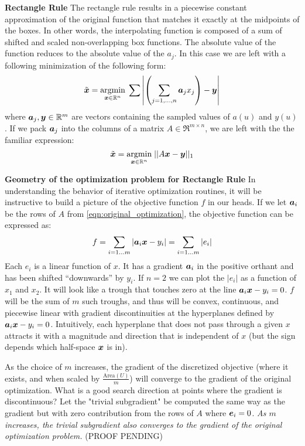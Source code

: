 \documentclass[12pt,journal,draftcls,letterpaper,onecolumn]{IEEEtran}
\begin{document}
{\bf Rectangle Rule} The rectangle rule results in a piecewise constant approximation of the original function that matches it exactly at the midpoints of the boxes. In other words, the interpolating function is composed of a sum of shifted and scaled non-overlapping box functions.  The absolute value of the function reduces to the absolute value of the $a_j$.  In this case we are left with a following minimization of the following form:
\begin{equation}\label{eqn:discrete1DBox}
\tilde{{\boldsymbol{x}}} = {\hbox{$\underset{{\boldsymbol{x}}\in \mathbb R^n}{\mbox{argmin}}\;$}} \sum{ \left|\left(\sum_{j=1,\ldots,n} \boldsymbol{a}_j x_j\right) - {\boldsymbol{y}}\right|}
\end{equation}
where $\boldsymbol{a}_j, {\boldsymbol{y}} \in \mathbb R^m$ are vectors containing the sampled values of $a(u)$ and $y(u)$.  If we pack $\boldsymbol{a}_j$ into the columns of a matrix $A \in \Re^{m \times n}$, we are left with the the familiar expression:
\begin{equation}\label{eqn:original_optimization}
\tilde{{\boldsymbol{x}}} = {\hbox{$\underset{{\boldsymbol{x}}\in \mathbb R^n}{\mbox{argmin}}\;$}} || A {\boldsymbol{x}} - {\boldsymbol{y}} ||_1
\end{equation}

{\bf Geometry of the optimization problem for Rectangle Rule}  In understanding the behavior of iterative optimization routines, it will be instructive to build a picture of the objective function $f$ in our heads.  If we let $\boldsymbol{a}_i$ be the rows of $A$ from \ref{eqn:original_optimization}, the objective function can be expressed as:
\begin{equation}
f = \sum_{i=1\ldots m}| \boldsymbol{a}_i {\boldsymbol{x}} - y_i | = \sum_{i=1\ldots m} |e_i|
\end{equation}
Each $e_i$ is a linear function of $x$. It has a gradient $\boldsymbol{a}_i$ in the positive orthant and has been shifted ``downwards'' by $y_i$.  If $n=2$ we can plot the $|e_i|$ as a function of $x_1$ and $x_2$.  It will look like a trough that touches zero at the line $\boldsymbol{a}_i {\boldsymbol{x}} - y_i=0$.  $f$ will be the sum of $m$ such troughs, and thus will be convex, continuous, and piecewise linear with gradient discontinuities at the hyperplanes defined by $\boldsymbol{a}_i {\boldsymbol{x}} - y_i=0$. Intuitively, each hyperplane that does not pass through a given $x$ attracts it with a magnitude and direction that is independent of $x$ (but the sign depends which half-space ${\boldsymbol{x}}$ is in).

As the choice of $m$ increases, the gradient of the discretized objective (where it exists, and when scaled by $\frac{\textrm{Area}(U)}{m}$) will converge to the gradient of the original optimization.  What is a good search direction at points where the gradient is discontinuous?  Let the "trivial subgradient" be computed the same way as the gradient but with zero contribution from the rows of $A$ where $\boldsymbol{e}_i=0$. {\em As $m$ increases, the trivial subgradient also converges to the gradient of the original optimization problem.} (PROOF PENDING)
\end{document}

